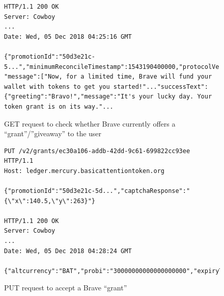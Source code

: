 \documentclass[sigconf]{acmart}
\begin{document}
\begin{appendices}
\begin{figure}
\begin{lstlisting}
HTTP/1.1 200 OK
Server: Cowboy
...
Date: Wed, 05 Dec 2018 04:25:16 GMT

{"promotionId":"50d3e21c-5...","minimumReconcileTimestamp":1543190400000,"protocolVersion":2,"stateWallet":... "message":["Now, for a limited time, Brave will fund your wallet with tokens to get you started!"..."successText":{"greeting":"Bravo!","message":"It's your lucky day. Your token grant is on its way."...
\end{lstlisting}
\caption{GET request to check whether Brave currently offers a ``grant''/''giveaway'' to the user}
\label{fig:get_grant}
\end{figure}

\begin{figure}
\begin{lstlisting}
PUT /v2/grants/ec30a106-addb-42dd-9c61-699822cc93ee HTTP/1.1
Host: ledger.mercury.basicattentiontoken.org

{"promotionId":"50d3e21c-5d...","captchaResponse":"{\"x\":140.5,\"y\":263}"}

HTTP/1.1 200 OK
Server: Cowboy
...
Date: Wed, 05 Dec 2018 04:28:24 GMT

{"altcurrency":"BAT","probi":"30000000000000000000","expiryTime":1552608000}
\end{lstlisting}
\caption{PUT request to accept a Brave ``grant''}
\label{fig:put_grant}
\end{figure}

\end{appendices}
\end{document}
